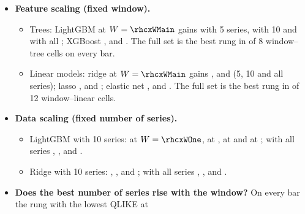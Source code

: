 \begin{itemize}
\begin{itemize}
    window--model gates).
  \item Gain $G(W, k)$: the QLIKE of the same window's $k = 0$ rung minus the rung's, $\times 10^3$, on the
    \rhcxNBars{} scored bars of Table~\ref{tab:rh_oos} and on the 16:00 bar; Diebold--Mariano tests against $k = 0$
    (HLN, Newey--West lag \rhcxHacLag). Figures~\ref{fig:rh_cx_features} and~\ref{fig:rh_cx_data}.
  \end{itemize}
\item \textbf{Feature scaling (fixed window).}
  \begin{itemize}
  \item Trees: LightGBM at $W = \rhcxWMain$ gains \rhcxGainLgbmBarMainFive{} with 5 series, \rhcxGainLgbmBarMainTen{}
    with 10 and \rhcxGainLgbmBarMainFull{} with all \rhcxNSeries; XGBoost \rhcxGainXgbBarMainFive,
    \rhcxGainXgbBarMainTen{} and \rhcxGainXgbBarMainFull. The full set is the best rung in \rhcxNFullBestTreesBar{} of 8
    window--tree cells on every bar.
  \item Linear models: ridge at $W = \rhcxWMain$ gains \rhcxGainRidgeBarMainFive, \rhcxGainRidgeBarMainTen{} and
    \rhcxGainRidgeBarMainFull{} (5, 10 and all series); lasso \rhcxGainLassoBarMainFive, \rhcxGainLassoBarMainTen{}
    and \rhcxGainLassoBarMainFull; elastic net \rhcxGainEnetBarMainFive, \rhcxGainEnetBarMainTen{} and
    \rhcxGainEnetBarMainFull. The full set is the best rung in \rhcxNFullBestLinearBar{} of 12 window--linear cells.
  \end{itemize}
\item \textbf{Data scaling (fixed number of series).}
  \begin{itemize}
  \item LightGBM with 10 series: \rhcxGainLgbmBarOneTen{} at $W = \rhcxWOne$, \rhcxGainLgbmBarTwoTen{} at \rhcxWTwo,
    \rhcxGainLgbmBarMainTen{} at \rhcxWMain{} and \rhcxGainLgbmBarLongTen{} at \rhcxWLong; with all series
    \rhcxGainLgbmBarOneFull, \rhcxGainLgbmBarTwoFull, \rhcxGainLgbmBarMainFull{} and \rhcxGainLgbmBarLongFull.
  \item Ridge with 10 series: \rhcxGainRidgeBarOneTen, \rhcxGainRidgeBarTwoTen, \rhcxGainRidgeBarMainTen{} and
    \rhcxGainRidgeBarLongTen; with all series \rhcxGainRidgeBarOneFull, \rhcxGainRidgeBarTwoFull,
    \rhcxGainRidgeBarMainFull{} and \rhcxGainRidgeBarLongFull.
  \end{itemize}
\item \textbf{Does the best number of series rise with the window?} On every bar the rung with the lowest QLIKE at

\end{itemize}
